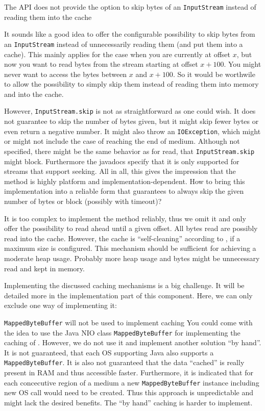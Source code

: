 {%
The \COMPmedia{} API does not provide the option to skip bytes of an \texttt{InputStream} instead of reading them into the cache
}
{%
It sounds like a good idea to offer the configurable possibility to skip bytes from an \texttt{InputStream} instead of unnecessarily reading them (and put them into a cache). This mainly applies for the case when you are currently at offset $x$, but now you want to read bytes from the stream starting at offset $x+100$. You might never want to access the bytes between $x$ and $x+100$. So it would be worthwile to allow the possibility to simply skip them instead of reading them into memory and into the cache.

However, \texttt{InputStream.skip} is not as straightforward as one could wish. It does not guarantee to skip the number of bytes given, but it might skip fewer bytes or even return a negative number. It might also throw an \texttt{IOException}, which might or might not include the case of reaching the end of medium. Although not specified, there might be the same behavior as for read, that \texttt{InputStream.skip} might block. Furthermore the javadocs specify that it is only supported for streams that support seeking. All in all, this gives the impression that the method is highly platform and implementation-dependent. How to bring this implementation into a reliable form that guarantees to always skip the given number of bytes or block (possibly with timeout)?
}
{%
It is too complex to implement the method reliably, thus we omit it and only offer the possibility to read ahead until a given offset. All bytes read are possibly read into the cache. However, the cache is ``self-cleaning'' according to , if a maximum size is configured. This mechanism should be sufficient for achieving a moderate heap usage.
}
{%
Probably more heap usage and bytes might be unnecessary read and kept in memory.
}

Implementing the discussed caching mechanisms is a big challenge. It will be detailed more in the implementation part of this component. Here, we can only exclude one way of implementing it:

{%
\texttt{MappedByteBuffer} will not be used to implement caching
}
{%
You could come with the idea to use the Java NIO class \texttt{MappedByteBuffer} for implementing the caching of . However, we do not use it and implement another solution ``by hand''.
}
{%
It is not guaranteed, that each OS supporting Java also supports a \texttt{MappedByteBuffer}. It is also not guaranteed that the data ``cached'' is really present in RAM and thus accessible faster. Furthermore, it is indicated that for each concecutive region of a medium a new \texttt{MappedByteBuffer} instance including new OS call would need to be created. Thus this approach is unpredictable and might lack the desired benefits.
}
{%
The ``by hand'' caching is harder to implement.
}

